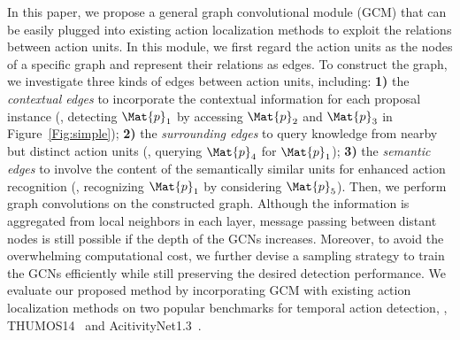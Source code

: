\documentclass[10pt,journal,compsoc]{IEEEtran}
\begin{document}
	
	In this paper, we propose a general graph convolutional module (GCM) that can be easily plugged into existing action localization methods to exploit the relations between action units. 
	In this module, we first regard the action units as the nodes of a specific graph and represent their relations as edges. To construct the graph, we investigate  three kinds of edges between action units, including: \textbf{1)} the \emph{contextual edges} to incorporate the contextual information for each proposal instance (\eg, detecting $\Mat{p}_1$ by accessing $\Mat{p}_2$ and $\Mat{p}_3$ in Figure~\ref{Fig:simple}); \textbf{2)} the \emph{surrounding edges} to query knowledge from nearby but distinct action units (\eg, querying $\Mat{p}_4$ for $\Mat{p}_1$); \textbf{3)} the \emph{semantic edges} to
	involve the content of the semantically similar units for enhanced action recognition (\eg, recognizing $\Mat{p}_1$ by considering $\Mat{p}_5$). 
	Then, we perform graph convolutions on the constructed graph. Although the information is aggregated from local neighbors in each layer,
	message passing between distant nodes is still possible if the depth of the GCNs increases.
	Moreover, to avoid the overwhelming computational cost, we further devise a sampling strategy to train the GCNs efficiently while still preserving the desired detection performance. We evaluate our proposed method by incorporating GCM with existing action localization methods on two popular benchmarks for temporal action detection, \ie, THUMOS14~\cite{jiang2014thumos} and AcitivityNet1.3~\cite{caba2015activitynet}.
	
\end{document}
